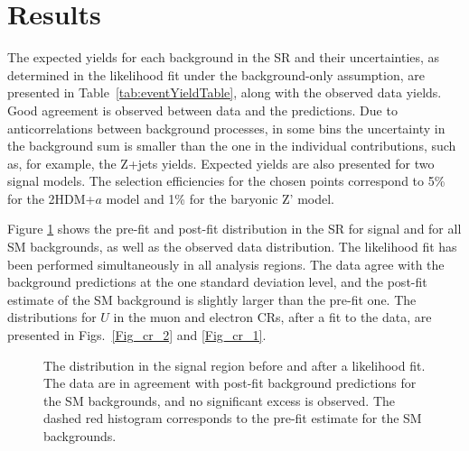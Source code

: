\section{Results}

The expected yields for each background in the SR and their uncertainties, as determined in the likelihood fit under the background-only assumption, are presented in Table~\ref{tab:eventYieldTable}, along with the observed data yields.
Good agreement is observed between data and the predictions. Due to anticorrelations between background processes, in some bins the uncertainty in the background sum is smaller than the one in the individual contributions, such as, for example, the Z+jets yields. Expected yields are also presented for two signal models. The selection efficiencies for the chosen points correspond to 5\% for the 2HDM+$a$ model and 1\% for the baryonic Z' model. %


Figure \ref{Fig_sr} shows the pre-fit and post-fit \MET distribution in the SR for signal and for all SM backgrounds, as well as the observed data distribution. The likelihood fit has been performed simultaneously in all analysis regions. The data agree with the background predictions at the one standard deviation level, and the post-fit estimate of the SM background is slightly larger than the pre-fit one. The distributions for $U$ in the muon and electron CRs, after a fit to the data, are presented in Figs.~\ref{Fig_cr_2} and \ref{Fig_cr_1}.

\begin{figure}
\centering
\caption{The \MET distribution in the signal region before and after a likelihood fit. The data are in agreement with post-fit background predictions for the SM backgrounds, and no significant excess is observed. The dashed red histogram corresponds to the pre-fit estimate for the SM backgrounds.}
\label{Fig_sr}
\end{figure}

